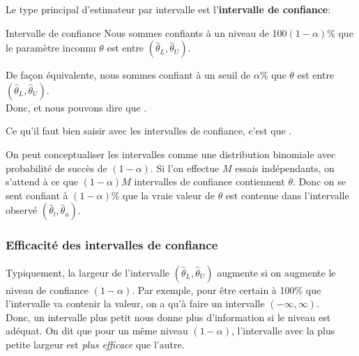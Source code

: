 \documentclass[10pt, french]{article}
\begin{document}
\begin{multicols*}{2}
Le type principal d'estimateur par intervalle est l'\textbf{intervalle de confiance}:
\begin{algo}{Intervalle de confiance}
Nous sommes confiants à un niveau de 100$(1 - \alpha)$\% que le paramètre inconnu $\theta$ est entre $(\hat{\theta}_{L}, \hat{\theta}_{U})$. 

De façon équivalente, nous sommes confiant à un seuil de $\alpha$\% que $\theta$ est entre $(\hat{\theta}_{L}, \hat{\theta}_{U})$.\\

Donc,  et nous pouvons dire que  .
\end{algo}

Ce qu'il faut bien saisir avec les intervalles de confiance, c'est que .

On peut conceptualiser les intervalles comme une distribution binomiale avec probabilité de succès de $(1 - \alpha)$. Si l'on effectue $M$ essais indépendants, on s'attend à ce que $(1 - \alpha)M$ intervalles de confiance contiennent $\theta$. Donc on se sent confiant à $(1 - \alpha)\%$ que la vraie valeur de $\theta$ est contenue dans l'intervalle observé $(\hat{\theta}_{l}, \hat{\theta}_{u})$.

\subsubsection*{Efficacité des intervalles de confiance}
Typiquement, la largeur de l'intervalle $(\hat{\theta}_{L}, \hat{\theta}_{U})$ augmente si on augmente le niveau de confiance $(1 - \alpha)$. Par exemple, pour être certain à 100\% que l'intervalle va contenir la valeur, on a qu'à faire un intervalle $(-\infty, \infty)$.\\

Donc, un intervalle plus petit nous donne plus d'information si le niveau est adéquat. On dit que pour un même niveau $(1 - \alpha)$, l'intervalle avec la plus petite largeur est \textit{plus efficace} que l'autre.


\end{multicols*}
\end{document}
